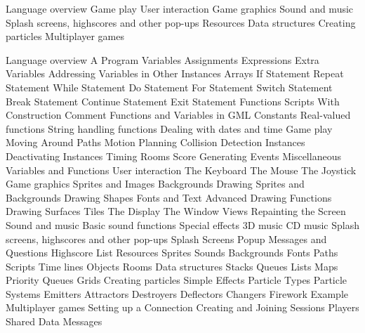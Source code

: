 Language overview
Game play
User interaction
Game graphics
Sound and music
Splash screens, highscores and other pop-ups
Resources
Data structures
Creating particles
Multiplayer games


Language overview
  A Program
  Variables
  Assignments
  Expressions
  Extra Variables
  Addressing Variables in Other Instances
  Arrays
  If Statement
  Repeat Statement
  While Statement
  Do Statement
  For Statement
  Switch Statement
  Break Statement
  Continue Statement
  Exit Statement
  Functions
  Scripts
  With Construction
  Comment
  Functions and Variables in GML
  Constants
  Real-valued functions
  String handling functions
  Dealing with dates and time
Game play
  Moving Around
  Paths
  Motion Planning
  Collision Detection
  Instances
  Deactivating Instances
  Timing
  Rooms
  Score
  Generating Events
  Miscellaneous Variables and Functions
User interaction
  The Keyboard
  The Mouse
  The Joystick
Game graphics
  Sprites and Images
  Backgrounds
  Drawing Sprites and Backgrounds
  Drawing Shapes
  Fonts and Text
  Advanced Drawing Functions
  Drawing Surfaces
  Tiles
  The Display
  The Window
  Views
  Repainting the Screen
Sound and music
  Basic sound functions
  Special effects
  3D music
  CD music
Splash screens, highscores and other pop-ups
  Splash Screens
  Popup Messages and Questions
  Highscore List
Resources
  Sprites
  Sounds
  Backgrounds
  Fonts
  Paths
  Scripts
  Time lines
  Objects
  Rooms
Data structures
  Stacks
  Queues
  Lists
  Maps
  Priority Queues
  Grids
Creating particles
  Simple Effects
  Particle Types
  Particle Systems
  Emitters
  Attractors
  Destroyers
  Deflectors
  Changers
  Firework Example
Multiplayer games
  Setting up a Connection
  Creating and Joining Sessions
  Players
  Shared Data
  Messages
